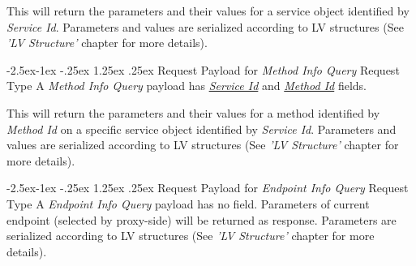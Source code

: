 \documentclass[10pt,a4paper]{article}
\makeatletter
\renewcommand\paragraph{\@startsection{paragraph}{4}{\z@}%
            {-2.5ex\@plus -1ex \@minus -.25ex}%
            {1.25ex \@plus .25ex}%
            {\normalfont\normalsize\bfseries}}
\makeatother
\begin{document}
This will return the parameters and their values for a service object identified by \textit{Service Id}. Parameters and values are serialized according to LV structures (See \textit{'LV Structure'} chapter for more details).

\paragraph{Request Payload for \textit{Method Info Query} Request Type} 
A \textit{Method Info Query} payload has \underline{\textit{Service Id}} and \underline{\textit{Method Id}} fields.

\begin{flushleft}
\end{flushleft}

This will return the parameters and their values for a method identified by \textit{Method Id} on a specific service object identified by \textit{Service Id}. Parameters and values are serialized according to LV structures (See \textit{'LV Structure'} chapter for more details).

\paragraph{Request Payload for \textit{Endpoint Info Query} Request Type} 
A \textit{Endpoint Info Query} payload has no field. Parameters of current endpoint (selected by proxy-side) will be returned as response. Parameters are serialized according to LV structures (See \textit{'LV Structure'} chapter for more details).
\end{document}
